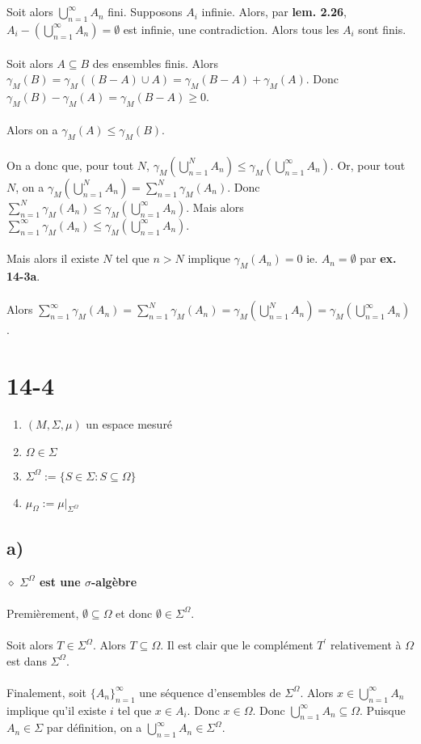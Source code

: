 \documentclass[a4paper,10pt]{article}
\begin{document}
\\
\\
Soit alors $\bigcup_{n=1}^\infty A_n$ fini. Supposons $A_i$ infinie. Alors, par \textbf{lem. 2.26}, $A_i - (\bigcup_{n=1}^\infty A_n) = \emptyset$ est infinie, une contradiction. Alors tous les $A_i$ sont finis. 
\\
\\
Soit alors $A \subseteq B$ des ensembles finis. Alors $\gamma_M (B) = \gamma_M((B-A) \cup A) = \gamma_M (B-A) + \gamma_M (A)$. Donc $\gamma_M (B) - \gamma_M(A) = \gamma_M (B - A) \geq 0$.
\\
\\
Alors on a $\gamma_M (A) \leq \gamma_M (B)$.
\\
\\
On a donc que, pour tout $N$, $\gamma_M (\bigcup_{n=1}^N A_n) \leq \gamma_M (\bigcup_{n=1}^\infty A_n)$. Or, pour tout $N$, on a $\gamma_M (\bigcup_{n=1}^N A_n) = \sum_{n=1}^N \gamma_M (A_n)$. Donc $\sum_{n=1}^N \gamma_M (A_n) \leq \gamma_M (\bigcup_{n=1}^\infty A_n)$. Mais alors $\sum_{n=1}^\infty \gamma_M (A_n) \leq \gamma_M (\bigcup_{n=1}^\infty A_n)$.
\\
\\
Mais alors il existe $N$ tel que $n > N$ implique $\gamma_M (A_n) = 0$ ie. $A_n = \emptyset$ par \textbf{ex. 14-3a}.
\\
\\
Alors $\sum_{n=1}^\infty \gamma_M (A_n) = \sum_{n=1}^N \gamma_M (A_n) = \gamma_M (\bigcup_{n=1}^N A_n) = \gamma_M (\bigcup_{n=1}^\infty A_n)$.

\section*{14-4}
\begin{enumerate}
	\item $(M, \Sigma, \mu)$ un espace mesuré
	\item $\Omega \in \Sigma$
	\item $\Sigma^\Omega := \{S \in \Sigma : S \subseteq \Omega\}$
	\item $\mu_\Omega := \mu |_{\Sigma^\Omega}$
\end{enumerate}
\subsection*{a)}
$\diamond$ \textbf{$\Sigma^\Omega$ est une $\sigma$-algèbre}
\\
\\
Premièrement, $\emptyset \subseteq \Omega$ et donc $\emptyset \in \Sigma^\Omega$.
\\
\\
Soit alors $T \in \Sigma^\Omega$. Alors $T \subseteq \Omega$. Il est clair que le complément $T^\prime$ relativement à $\Omega$ est dans $\Sigma^\Omega$.
\\
\\
Finalement, soit $\{A_n\}_{n=1}^\infty$ une séquence d'ensembles de $\Sigma^\Omega$. Alors $x \in \bigcup_{n=1}^\infty A_n$ implique qu'il existe $i$ tel que $x \in A_i$. Donc $x \in \Omega$. Donc $\bigcup_{n=1}^\infty A_n \subseteq \Omega$. Puisque $A_n \in \Sigma$ par définition, on a $\bigcup_{n=1}^\infty A_n \in \Sigma^\Omega$.
\end{document}
